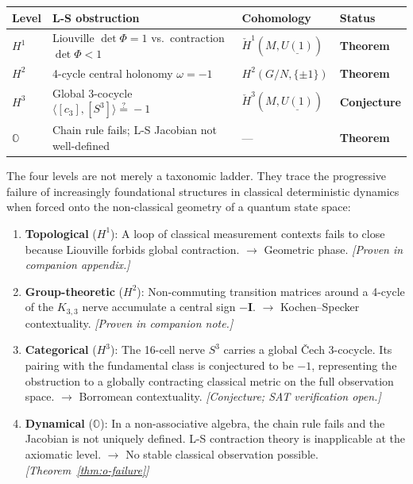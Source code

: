 \documentclass[11pt]{article}
\begin{document}
\begin{center}
\begin{tabular}{llll}
\toprule
Level & L-S obstruction & Cohomology & Status \\
\midrule
$H^1$ & Liouville $\det\Phi = 1$ vs.\ contraction $\det\Phi < 1$ &
$\check{H}^1(M, \underline{U(1)})$ & \textbf{Theorem} \\
$H^2$ & 4-cycle central holonomy $\omega = -1$ &
$H^2(G/N, \{\pm 1\})$ & \textbf{Theorem} \\
$H^3$ & Global 3-cocycle $\langle [c_3], [S^3] \rangle \stackrel{?}{=} -1$ &
$\check{H}^3(M, \underline{U(1)})$ & \textbf{Conjecture} \\
$\mathbb{O}$ & Chain rule fails; L-S Jacobian not well-defined &
--- & \textbf{Theorem} \\
\bottomrule
\end{tabular}
\end{center}

The four levels are not merely a taxonomic ladder. They trace the
progressive failure of increasingly foundational structures in classical
deterministic dynamics when forced onto the non-classical geometry of a
quantum state space:

\begin{enumerate}
  \item \textbf{Topological} ($H^1$): A loop of classical measurement
    contexts fails to close because Liouville forbids global contraction.
    $\to$ Geometric phase.
    \hfill\textit{[Proven in companion appendix.]}

  \item \textbf{Group-theoretic} ($H^2$): Non-commuting transition matrices
    around a 4-cycle of the $K_{3,3}$ nerve accumulate a central sign
    $-\mathbf{I}$. $\to$ Kochen--Specker contextuality.
    \hfill\textit{[Proven in companion note.]}

  \item \textbf{Categorical} ($H^3$): The 16-cell nerve $S^3$ carries a
    global Čech 3-cocycle. Its pairing with the fundamental class is
    conjectured to be $-1$, representing the obstruction to a globally
    contracting classical metric on the full observation space.
    $\to$ Borromean contextuality.
    \hfill\textit{[Conjecture; SAT verification open.]}

  \item \textbf{Dynamical} ($\mathbb{O}$): In a non-associative algebra,
    the chain rule fails and the Jacobian is not uniquely defined.
    L-S contraction theory is inapplicable at the axiomatic level.
    $\to$ No stable classical observation possible.
    \hfill\textit{[Theorem~\ref{thm:o-failure}]}
\end{enumerate}
\end{document}
